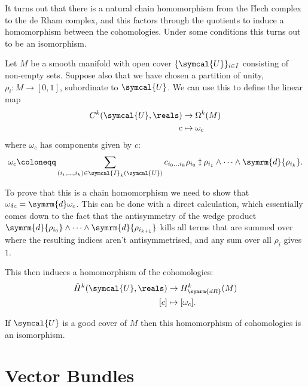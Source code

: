 \documentclass[fleqn]{NotesClass}
\renewcommand{\dl}{\symrm{d}}
\newcommand{\openCover}{\symcal{U}}
\newcommand{\derham}{\symrm{dR}}
\begin{document}
    It turns out that there is a natural chain homomorphism from the \v{H}ech complex to the de Rham complex, and this factors through the quotients to induce a homomorphism between the cohomologies.
    Under some conditions this turns out to be an isomorphism.
    
    Let \(M\) be a smooth manifold with open cover \(\{\openCover\}_{i \in I}\) consisting of non-empty sets.
    Suppose also that we have chosen a partition of unity, \(\rho_i \colon M \to [0, 1]\), subordinate to \(\openCover\).
    We can use this to define the linear map
    \begin{align}
        C^k(\openCover, \reals) &\to \Omega^k(M)\\
        c &\mapsto \omega_c
    \end{align}
    where \(\omega_c\) has components given by \(c\):
    \begin{equation}
        \omega_c \coloneqq \sum_{(i_i, \dotsc, i_k) \in \symcal{I}_k(\openCover)} c_{i_0 \dotso i_k} \rho_{i_0} \ddagger\rho_{i_1} \wedge \dotsb \wedge \dl{\rho_{i_k}}.
    \end{equation}
    
    To prove that this is a chain homomorphism we need to show that \(\omega_{\delta c} = \dl \omega_c\).
    This can be done with a direct calculation, which essentially comes down to the fact that the antisymmetry of the wedge product \(\dl{\rho_{i_0}} \wedge \dotsb \wedge \dl{\rho_{i_{k+1}}}\) kills all terms that are summed over where the resulting indices aren't antisymmetrised, and any sum over all \(\rho_i\) gives \(1\).
    
    This then induces a homomorphism of the cohomologies:
    \begin{align}
        \check{H}^{k}(\openCover, \reals) &\to H_{\derham}^{k}(M)\\
        [c] &\mapsto [\omega_c].
    \end{align}
    
    \begin{thm}{}{}
        If \(\openCover\) is a good cover of \(M\) then this homomorphism of cohomologies is an isomorphism.
    \end{thm}
    
    \chapter{Vector Bundles}
    
    
    
%        
%
	\backmatter
	\renewcommand{\glossaryname}{Acronyms}
	\printglossary[acronym]
	\printindex
\end{document}
